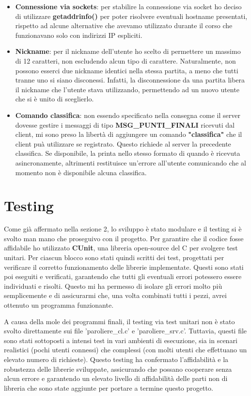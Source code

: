\documentclass[a4paper]{article}
\begin{document}
\begin{itemize}
        \item \textbf{Connessione via sockets}: per stabilire la connessione via socket ho deciso di utilizzare \textbf{getaddrinfo()} per poter risolvere eventuali hostname presentati, rispetto ad alcune alternative che avevamo utilizzato durante il corso che funzionavano solo con indirizzi IP espliciti.
        \item \textbf{Nickname}: per il nickname dell'utente ho scelto di permettere un massimo di 12 caratteri, non escludendo alcun tipo di carattere. Naturalmente, non possono esserci due nickname identici nella stessa partita, a meno che tutti tranne uno si siano disconessi. Infatti, la disconnessione da una partita libera il nickname che l'utente stava utilizzando, permettendo ad un nuovo utente che si è unito di sceglierlo.
        \item \textbf{Comando classifica}: non essendo specificato nella consegna come il server dovesse gestire i messaggi di tipo \textbf{MSG\_PUNTI\_FINALI} ricevuti dal client, mi sono preso la libertà di aggiungere un comando \textbf{"classifica"} che il client puà utilizzare se registrato. Questo richiede al server la precedente classifica. Se disponibile, la printa nello stesso formato di quando è ricevuta asincronamente, altrimenti restituisce un'errore all'utente comunicando che al momento non è disponibile alcuna classifica.
    \end{itemize}


    
    \section{Testing}
    Come già affermato nella sezione 2, lo sviluppo è stato modulare e il testing si è svolto man mano che proseguivo con il progetto. Per garantire che il codice fosse affidabile ho utilizzato \textbf{CUnit}, una libreria open-source del C per svolgere test unitari. Per ciascun blocco sono stati quindi scritti dei test, progettati per verificare il corretto funzionamento delle librerie implementate. Questi sono stati poi eseguiti e verificati, garantendo che tutti gli eventuali errori potessero essere individuati e risolti. Questo mi ha permesso di isolare gli errori molto più semplicemente e di assicurarmi che, una volta combinati tutti i pezzi, avrei ottenuto un programma funzionante. 
    
    A causa della mole dei programmi finali, il testing via test unitari non è stato svolto direttamente sui file 'paroliere\_cl.c' e 'paroliere\_srv.c'. Tuttavia, questi file sono stati sottoposti a intensi test in vari ambienti di esecuzione, sia in scenari realistici (pochi utenti connessi) che complessi (con molti utenti che effettuano un elevato numero di richieste). Questo testing ha confermato l'affidabilità e la robustezza delle librerie sviluppate, assicurando che possano cooperare senza alcun errore e garantendo un elevato livello di affidabilità delle parti non di libreria che sono state aggiunte per portare a termine questo progetto.
    
\end{document}

